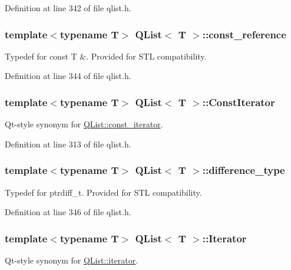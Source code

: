 Definition at line 342 of file qlist.\+h.

\subsubsection[{\texorpdfstring{const\+\_\+reference}{const_reference}}]{\setlength{\rightskip}{0pt plus 5cm}template$<$typename T$>$ {\bf Q\+List}$<$ T $>$\+::{\bf const\+\_\+reference}}\hypertarget{class_q_list_ae8717226a5e2af5b53d3e22d4b1654aa}{}\label{class_q_list_ae8717226a5e2af5b53d3e22d4b1654aa}
Typedef for const T \&. Provided for S\+TL compatibility. 

Definition at line 344 of file qlist.\+h.

\subsubsection[{\texorpdfstring{Const\+Iterator}{ConstIterator}}]{\setlength{\rightskip}{0pt plus 5cm}template$<$typename T$>$ {\bf Q\+List}$<$ T $>$\+::{\bf Const\+Iterator}}\hypertarget{class_q_list_a2bac7028ad973eb7ff10b2bb1fc58305}{}\label{class_q_list_a2bac7028ad973eb7ff10b2bb1fc58305}
Qt-\/style synonym for \hyperlink{class_q_list_1_1const__iterator}{Q\+List\+::const\+\_\+iterator}. 

Definition at line 313 of file qlist.\+h.

\subsubsection[{\texorpdfstring{difference\+\_\+type}{difference_type}}]{\setlength{\rightskip}{0pt plus 5cm}template$<$typename T$>$ {\bf Q\+List}$<$ T $>$\+::{\bf difference\+\_\+type}}\hypertarget{class_q_list_a253a81bf62c0d83e0f5e8abc61ac87f9}{}\label{class_q_list_a253a81bf62c0d83e0f5e8abc61ac87f9}
Typedef for ptrdiff\+\_\+t. Provided for S\+TL compatibility. 

Definition at line 346 of file qlist.\+h.

\subsubsection[{\texorpdfstring{Iterator}{Iterator}}]{\setlength{\rightskip}{0pt plus 5cm}template$<$typename T$>$ {\bf Q\+List}$<$ T $>$\+::{\bf Iterator}}\hypertarget{class_q_list_acfbe3160851f25b0daeec4c7b0439f35}{}\label{class_q_list_acfbe3160851f25b0daeec4c7b0439f35}
Qt-\/style synonym for \hyperlink{class_q_list_1_1iterator}{Q\+List\+::iterator}. 

